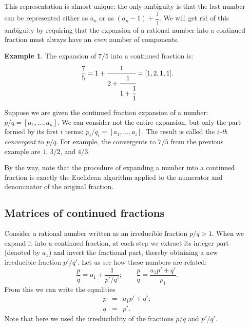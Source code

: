 \documentclass[a4paper,11pt]{amsart}
\theoremstyle{plain}
\theoremstyle{remark}
\theoremstyle{definition}
\newtheorem{example}[theorem]{Example}
\numberwithin{equation}{section}
\numberwithin{figure}{section}
\begin{document}
This representation is almost unique; the only ambiguity is that the last number can be represented either as $a_n$ or as $(a_n - 1) + \dfrac{1}{1}$. We will get rid of this ambiguity by requiring that the expansion of a rational number into a continued fraction must always have an \emph{even} number of components.

\begin{example}\label{ex:running} The expansion of $7/5$ into a continued fraction is:
\[
\frac{7}{5} = 1 + \cfrac{1}{2 + \cfrac{1}{1 + \cfrac{1}{1}}} = [1, 2, 1, 1].
\]
\end{example}

Suppose we are given the continued fraction expansion of a number: $p/q = [a_1, \dots, a_n]$. We can consider not the entire expansion, but only the part formed by its first $i$ terms: $p_i/q_i = [a_1, \dots, a_i]$. The result is called the \emph{$i$-th convergent} to $p/q$. For example, the convergents to $7/5$ from the previous example are $1$, $3/2$, and $4/3$.

By the way, note that the procedure of expanding a number into a continued fraction is exactly the Euclidean algorithm applied to the numerator and denominator of the original fraction.

\subsection{Matrices of continued fractions}

Consider a rational number written as an irreducible fraction $p/q > 1$. When we expand it into a continued fraction, at each step we extract its integer part (denoted by $a_1$) and invert the fractional part, thereby obtaining a new irreducible fraction $p'/q'$. Let us see how these numbers are related:
\[
\frac{p}{q} = a_1 + \frac{1}{p'/q'};\qquad \frac{p}{q} = \frac{a_1 p' + q'}{p_1}.
\]
From this we can write the equalities
\begin{eqnarray*}
p &=& a_1 p' + q';\\
q &=& p'.
\end{eqnarray*}
Note that here we used the irreducibility of the fractions $p/q$ and $p'/q'$.
\end{document}
